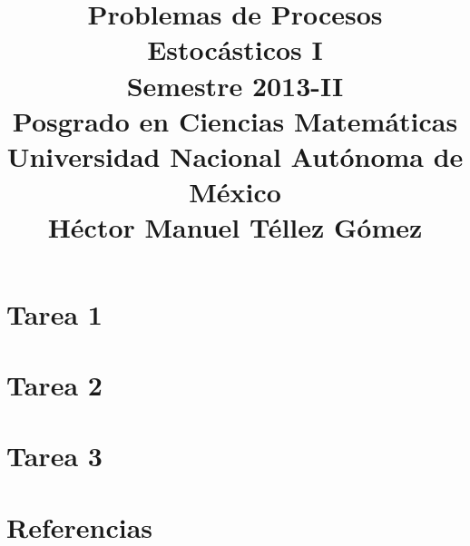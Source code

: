 \documentclass[a5paper,oneside]{amsart}
\title[Problemas de Procesos I]{
	Problemas de Procesos Estocásticos I\\ 
	Semestre 2013-II\\ 
	Posgrado en Ciencias Matemáticas\\ 
	Universidad Nacional Autónoma de México\\
	Héctor Manuel Téllez Gómez
}
\theoremstyle{dotless}
\numberwithin{section}{part}
\numberwithin{equation}{subsection}
\begin{document}
	\maketitle
	\part{Tarea 1}
		
		
		\nqed
		
	\part{Tarea 2}
		
		
		\nqed
		
	\part{Tarea 3}
		
		
		\nqed
		
	\part*{Referencias}
	
	
\end{document}
